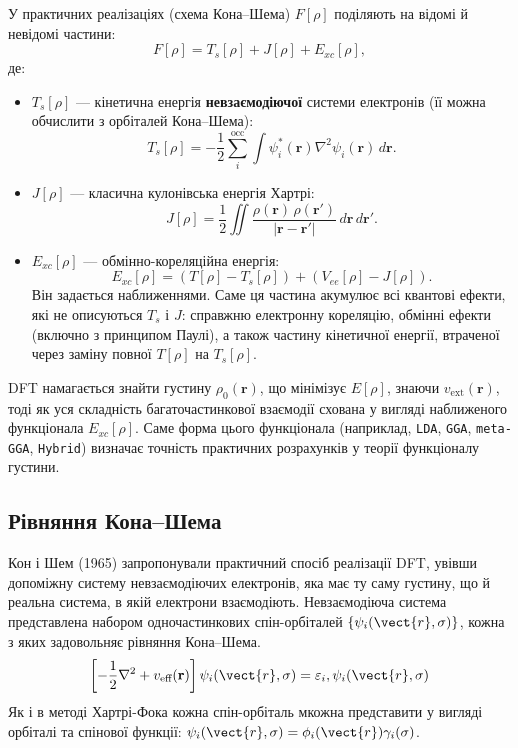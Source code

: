 \medskip
\noindent
У практичних реалізаціях (схема Кона--Шема) $F[\rho]$ поділяють на відомі й невідомі частини:
\begin{equation*}
	F[\rho] = T_s[\rho] + J[\rho] + E_{xc}[\rho],
\end{equation*}
де:
\begin{itemize}
	\item $T_s[\rho]$ --- кінетична енергія \textbf{невзаємодіючої} системи електронів (її можна обчислити з орбіталей Кона--Шема):
	      \begin{equation*}
		      T_s[\rho] = -\frac{1}{2} \sum_i^{\text{occ}} \int \psi_i^*(\mathbf{r}) \nabla^2 \psi_i(\mathbf{r})\, d\mathbf{r}.
	      \end{equation*}
	\item $J[\rho]$ --- класична кулонівська енергія Хартрі:
	      \begin{equation*}
		      J[\rho] = \frac{1}{2} \iint \frac{\rho(\mathbf{r})\, \rho(\mathbf{r'})}{|\mathbf{r}-\mathbf{r'}|}\, d\mathbf{r}\, d\mathbf{r'}.
	      \end{equation*}
	\item $E_{xc}[\rho]$ --- обмінно-кореляційна енергія:
	      \begin{equation*}
		      E_{xc}[\rho] = (T[\rho] - T_s[\rho]) + (V_{ee}[\rho] - J[\rho]).
	      \end{equation*}
	      Він задається наближеннями. Саме ця частина акумулює всі квантові ефекти, які не описуються $T_s$ і $J$: справжню електронну кореляцію, обмінні ефекти (включно з принципом Паулі), а також частину кінетичної енергії, втраченої через заміну повної $T[\rho]$ на $T_s[\rho]$.
\end{itemize}

DFT намагається знайти густину $\rho_0(\mathbf{r})$, що мінімізує $E[\rho]$, знаючи $v_{\text{ext}}(\mathbf{r})$, тоді як уся складність багаточастинкової взаємодії схована у вигляді наближеного функціонала $E_{xc}[\rho]$. Саме форма цього функціонала (наприклад, \texttt{LDA}, \texttt{GGA}, \texttt{meta-GGA}, \texttt{Hybrid}) визначає точність практичних розрахунків у теорії функціоналу густини.

\subsection{Рівняння Кона--Шема}

Кон і Шем (1965) запропонували практичний спосіб реалізації DFT, увівши допоміжну систему невзаємодіючих електронів, яка має ту саму густину, що й реальна система, в якій електрони взаємодіють.
Невзаємодіюча система представлена набором одночастинкових спін-орбіталей  $\{\psi_i(\vect{r}, \sigma)\}$, кожна з яких задовольняє рівняння Кона–Шема.
\begin{equation}
	\left[-\frac{1}{2}\nabla^2 + v_{\text{eff}}(\mathbf{r})\right] \psi_i(\vect{r}, \sigma) = \varepsilon_i, \psi_i(\vect{r}, \sigma)
\end{equation}
Як і в методі Хартрі-Фока кожна спін-орбіталь мкожна представити у вигляді орбіталі та спінової функції: $\psi_i(\vect{r}, \sigma) = \phi_i(\vect{r})\gamma_i(\sigma)$.

